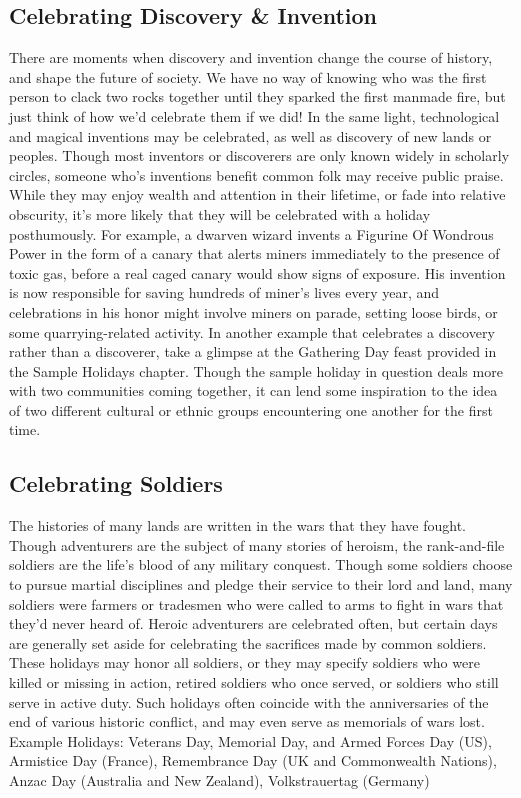 \documentclass[10pt,a4paper,twoside,twocolumn,openany,bg=print,nodeprecatedcode]{dndbook}
\begin{document}
\subsection{Celebrating Discovery \& Invention}
There are moments when discovery and invention change the course of history, and shape the future of society. We have no way of knowing who was the first person to clack two rocks together until they sparked the first manmade fire, but just think of how we'd celebrate them if we did! In the same light, technological and magical inventions may be celebrated, as well as discovery of new lands or peoples. Though most inventors or discoverers are only known widely in scholarly circles, someone who's inventions benefit common folk may receive public praise. While they may enjoy wealth and attention in their lifetime, or fade into relative obscurity, it's more likely that they will be celebrated with a holiday posthumously.
For example, a dwarven wizard invents a Figurine Of Wondrous Power in the form of a canary that alerts miners immediately to the presence of toxic gas, before a real caged canary would show signs of exposure. His invention is now responsible for saving hundreds of miner's lives every year, and celebrations in his honor might involve miners on parade, setting loose birds, or some quarrying-related activity.
In another example that celebrates a discovery rather than a discoverer, take a glimpse at the Gathering Day feast provided in the Sample Holidays chapter. Though the sample holiday in question deals more with two communities coming together, it can lend some inspiration to the idea of two different cultural or ethnic groups encountering one another for the first time.
\subsection{Celebrating Soldiers}
The histories of many lands are written in the wars that they have fought. Though adventurers are the subject of many stories of heroism, the rank-and-file soldiers are the life's blood of any military conquest. Though some soldiers choose to pursue martial disciplines and pledge their service to their lord and land, many soldiers were farmers or tradesmen who were called to arms to fight in wars that they'd never heard of.
Heroic adventurers are celebrated often, but certain days are generally set aside for celebrating the sacrifices made by common soldiers. These holidays may honor all soldiers, or they may specify soldiers who were killed or missing in action, retired soldiers who once served, or soldiers who still serve in active duty. Such holidays often coincide with the anniversaries of the end of various historic conflict, and may even serve as memorials of wars lost.
Example Holidays: Veterans Day, Memorial Day, and Armed Forces Day (US), Armistice Day (France), Remembrance Day (UK and Commonwealth Nations), Anzac Day (Australia and New Zealand), Volkstrauertag (Germany)
\end{document}
